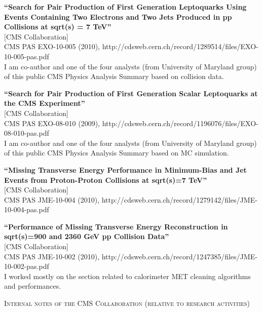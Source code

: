 \documentclass[10pt, a4paper]{article}
\begin{document}
\begin{thebibliography}{599}
{\bf ``Search for Pair Production of First Generation Leptoquarks Using Events Containing Two Electrons and Two Jets Produced in pp Collisions at sqrt(s) = 7 TeV''}
  \\{}[CMS Collaboration]
  \\{}CMS PAS EXO-10-005 (2010), http://cdsweb.cern.ch/record/1289514/files/EXO-10-005-pas.pdf 
  \\I am co-author and one of the four analysts (from University of Maryland group) of this public CMS Physics Analysis Summary based on collision data.

{\bf ``Search for Pair Production of First Generation Scalar Leptoquarks at the CMS Experiment''}
  \\{}[CMS Collaboration]
  \\{}CMS PAS EXO-08-010 (2009), http://cdsweb.cern.ch/record/1196076/files/EXO-08-010-pas.pdf
  \\I am co-author and one of the four analysts (from University of Maryland group) of this public CMS Physics Analysis Summary based on MC simulation.

{\bf ``Missing Transverse Energy Performance in Minimum-Bias and Jet Events from Proton-Proton Collisions at sqrt(s)=7 TeV''}
  \\{}[CMS Collaboration]
  \\{}CMS PAS JME-10-004 (2010), http://cdsweb.cern.ch/record/1279142/files/JME-10-004-pas.pdf 

{\bf ``Performance of Missing Transverse Energy Reconstruction in sqrt(s)=900 and 2360 GeV pp Collision Data''}
  \\{}[CMS Collaboration]
  \\{}CMS PAS JME-10-002 (2010), http://cdsweb.cern.ch/record/1247385/files/JME-10-002-pas.pdf 
  \\ I worked mostly on the section related to calorimeter MET cleaning algorithms and performances.

\vspace{0.1cm} \begin{center} \textsc{Internal notes of the CMS Collaboration (relative to research activities)} \end{center} \vspace{0.05cm}


\end{thebibliography}
\end{document}
